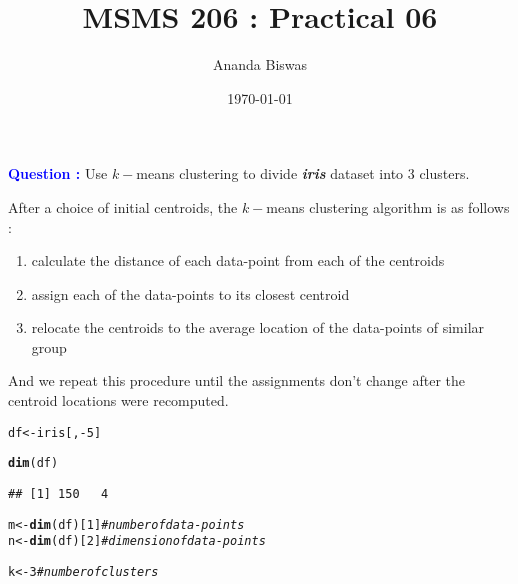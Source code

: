 \documentclass[11pt, a4paper]{article}\usepackage[]{graphicx}\usepackage[]{xcolor}
\title{MSMS 206 : Practical 06}
\author{Ananda Biswas}
\date{\today}
\makeatletter
\newcommand{\hlnum}[1]{\textcolor[rgb]{0.686,0.059,0.569}{#1}}%
\newcommand{\hlcom}[1]{\textcolor[rgb]{0.678,0.584,0.686}{\textit{#1}}}%
\newcommand{\hlopt}[1]{\textcolor[rgb]{0,0,0}{#1}}%
\newcommand{\hldef}[1]{\textcolor[rgb]{0.345,0.345,0.345}{#1}}%
\newcommand{\hlkwb}[1]{\textcolor[rgb]{0.69,0.353,0.396}{#1}}%
\newcommand{\hlkwd}[1]{\textcolor[rgb]{0.737,0.353,0.396}{\textbf{#1}}}%
\newenvironment{kframe}{%
 \def\at@end@of@kframe{}%
 \ifinner\ifhmode%
  \def\at@end@of@kframe{\end{minipage}}%
  \begin{minipage}{\columnwidth}%
 \fi\fi%
 \def\FrameCommand##1{\hskip\@totalleftmargin \hskip-\fboxsep
 \colorbox{shadecolor}{##1}\hskip-\fboxsep
     \hskip-\linewidth \hskip-\@totalleftmargin \hskip\columnwidth}%
 \MakeFramed {\advance\hsize-\width
   \@totalleftmargin\z@ \linewidth\hsize
   \@setminipage}}%
 {\par\unskip\endMakeFramed%
 \at@end@of@kframe}
\newenvironment{knitrout}{}{} %
\makeatother
\begin{document}
\maketitle


 \hspace{0.2cm} \textcolor{blue}{\textbf{Question :}} Use $k-$means clustering to divide \textbf{\textit{iris}} dataset into 3 clusters.

\vspace{1cm}

\faArrowAltCircleRight[regular] \hspace{0.2cm} After a choice of initial centroids, the $k-$means clustering algorithm is as follows :

\begin{enumerate}[(1)]
\item calculate the distance of each data-point from each of the centroids
\item assign each of the data-points to its closest centroid
\item relocate the centroids to the average location of the data-points of similar group
\end{enumerate}

And we repeat this procedure until the assignments don't change after the centroid locations were recomputed.

\begin{knitrout}
\color{fgcolor}\begin{kframe}
\begin{alltt}
\hldef{df} \hlkwb{<-} \hldef{iris[,} \hlopt{-}\hlnum{5}\hldef{]}
\end{alltt}
\end{kframe}
\end{knitrout}

\begin{knitrout}
\color{fgcolor}\begin{kframe}
\begin{alltt}
\hlkwd{dim}\hldef{(df)}
\end{alltt}
\begin{verbatim}
## [1] 150   4
\end{verbatim}
\end{kframe}
\end{knitrout}

\begin{knitrout}
\color{fgcolor}\begin{kframe}
\begin{alltt}
\hldef{m} \hlkwb{<-} \hlkwd{dim}\hldef{(df)[}\hlnum{1}\hldef{]} \hlcom{# number of data-points}
\hldef{n} \hlkwb{<-} \hlkwd{dim}\hldef{(df)[}\hlnum{2}\hldef{]} \hlcom{# dimension of data-points}

\hldef{k} \hlkwb{<-} \hlnum{3} \hlcom{# number of clusters}
\end{alltt}
\end{kframe}
\end{knitrout}
\end{document}
